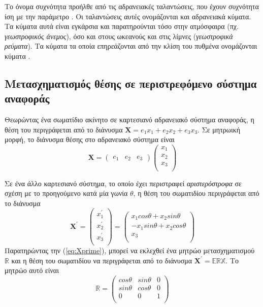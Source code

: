 Το όνομα συχνότητα \cor προήλθε από τις αδρανειακές ταλαντώσεις, που έχουν συχνότητα ίση με την παράμετρο \cor. Οι ταλαντώσεις αυτές ονομάζονται και αδρανειακά κύματα. Τα κύματα αυτά είναι εγκάρσια και παρατηρούνται τόσο στην ατμόσφαιρα (πχ. \textit{γεωστροφικός άνεμος}), όσο και στους ωκεανούς και στις λίμνες (\textit{γεωστροφικά ρεύματα}). Τα κύματα τα οποία επηρεάζονται από την κλίση του πυθμένα ονομάζονται κύματα \ros.

\subsection{Μετασχηματισμός θέσης σε περιστρεφόμενο σύστημα αναφοράς}
Θεωρώντας ένα σωματίδιο ακίνητο σε καρτεσιανό αδρανειακό σύστημα αναφοράς, η θέση του περιγράφεται από το διάνυσμα $\bm{X}=e_1x_1+e_2x_2+e_3x_3$. Σε μητρωική μορφή, το διάνυσμα θέσης στο αδρανειακό σύστημα είναι
\begin{equation}
\bm{X}=
\begin{pmatrix}
	e_1 & e_2 & e_3
\end{pmatrix}
\begin{pmatrix}
  x_{1} \\
  x_{2} \\
  x_{3} \\
\end{pmatrix}
\end{equation}

Σε ένα άλλο καρτεσιανό σύστημα, το οποίο έχει περιστραφεί \textit{αριστερόστροφα} σε σχέση με το προηγούμενο κατά μία γωνία $θ$, η θέση του σωματιδίου περιγράφεται από το διάνυσμα 
\begin{equation}
 \label{eq:Xprime}
 \bm{X^{\prime}} =
 \begin{pmatrix}
  x_{1}^{\prime} \\
  x_{2}^{\prime} \\
  x_{3}^{\prime} \\
 \end{pmatrix} = 
 \begin{pmatrix}
  x_{1}cos{θ}+x_{2}sin{θ} \\
  -x_{1}sin{θ}+x_{2}cos{θ} \\
  x_{3} \\
 \end{pmatrix}
\end{equation}
Παρατηρώντας την (\ref{eq:Xprime}), μπορεί να εκλεχθεί ένα μητρώο μετασχηματισμού $\mathbb{R}$ και η θέση του σωματιδίου να περιγράφεται από το διάνυσμα $\bm{X^{\prime}}=\mathbb{E}\mathbb{R}\mathbb{X}$. Το μητρώο αυτό είναι
\begin{equation}
 \label{eq:Rvector}
 \mathbb{R} =
 \begin{pmatrix}
  cos{θ} & sin{θ} & 0 \\
  sin{θ} & cos{θ} & 0 \\
  0      &   0    & 1 \\
 \end{pmatrix}
\end{equation}

